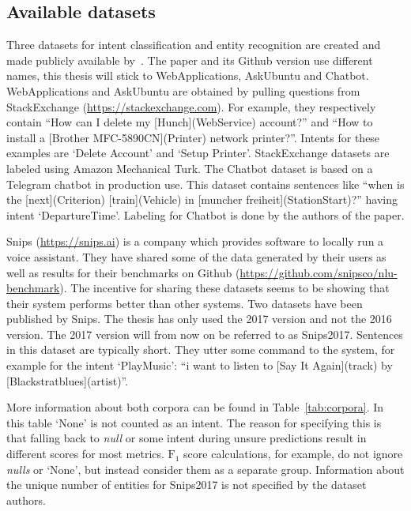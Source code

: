 \subsection{Available datasets}
\label{subsec:available_datasets}
Three datasets for intent classification and entity recognition are created and made publicly available by~\citet{braun2017}.
The paper and its Github version use different names, this thesis will stick to WebApplications, AskUbuntu and Chatbot.
WebApplications and AskUbuntu are obtained by pulling questions from StackExchange (\url{https://stackexchange.com}).
For example, they respectively contain ``How can I delete my [Hunch](WebService) account?'' and ``How to install a [Brother MFC-5890CN](Printer) network printer?''.
Intents for these examples are `Delete Account' and `Setup Printer'.
StackExchange datasets are labeled using Amazon Mechanical Turk.
The Chatbot dataset is based on a Telegram chatbot in production use.
This dataset contains sentences like ``when is the [next](Criterion) [train](Vehicle) in [muncher freiheit](StationStart)?'' having intent `DepartureTime'.
Labeling for Chatbot is done by the authors of the paper.

Snips (\url{https://snips.ai}) is a company which provides software to locally run a voice assistant.
They have shared some of the data generated by their users as well as results for their benchmarks on Github (\url{https://github.com/snipsco/nlu-benchmark}).
The incentive for sharing these datasets seems to be showing that their system performs better than other systems.
Two datasets have been published by Snips.
The thesis has only used the 2017 version and not the 2016 version.
The 2017 version will from now on be referred to as Snips2017.
Sentences in this dataset are typically short.
They utter some command to the system, for example for the intent `PlayMusic': ``i want to listen to [Say It Again](track) by [Blackstratblues](artist)''.

More information about both corpora can be found in Table~\ref{tab:corpora}.
In this table `None' is not counted as an intent.
The reason for specifying this is that falling back to \textit{null} or some intent during unsure predictions result in different scores for most metrics.
$\text{F}_1$ score calculations, for example, do not ignore \textit{nulls} or `None', but instead consider them as a separate group.
Information about the unique number of entities for Snips2017 is not specified by the dataset authors.

